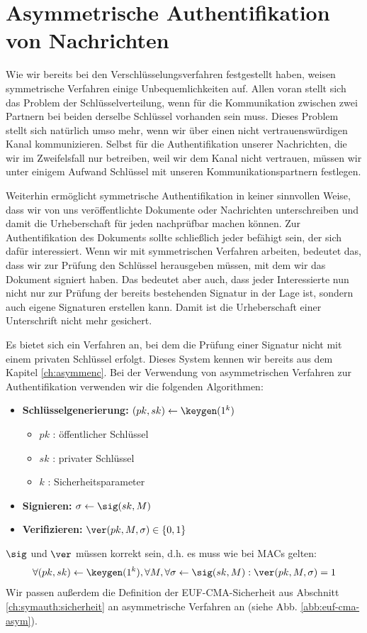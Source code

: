 \chapter{Asymmetrische Authentifikation von Nachrichten}
\label{cha:asymmauth}

Wie wir bereits bei den Verschlüsselungsverfahren festgestellt haben, weisen symmetrische Verfahren einige Unbequemlichkeiten auf. Allen voran stellt sich das Problem der Schlüsselverteilung, wenn für die Kommunikation zwischen zwei Partnern bei beiden derselbe Schlüssel vorhanden sein muss. Dieses Problem stellt sich natürlich umso mehr, wenn wir über einen nicht vertrauenswürdigen Kanal kommunizieren. Selbst für die Authentifikation unserer Nachrichten, die wir im Zweifelsfall nur betreiben, weil wir dem Kanal nicht vertrauen, müssen wir unter einigem Aufwand Schlüssel mit unseren Kommunikationspartnern festlegen.

Weiterhin ermöglicht symmetrische Authentifikation in keiner sinnvollen Weise, dass wir von uns veröffentlichte Dokumente oder Nachrichten unterschreiben und damit die Urheberschaft für jeden nachprüfbar machen können. Zur Authentifikation des Dokuments sollte schließlich jeder befähigt sein, der sich dafür interessiert. Wenn wir mit symmetrischen Verfahren arbeiten, bedeutet das, dass wir zur Prüfung den Schlüssel herausgeben müssen, mit dem wir das Dokument signiert haben. Das bedeutet aber auch, dass jeder Interessierte nun nicht nur zur Prüfung der bereits bestehenden Signatur in der Lage ist, sondern auch eigene Signaturen erstellen kann. Damit ist die Urheberschaft einer Unterschrift nicht mehr gesichert.

Es bietet sich ein Verfahren an, bei dem die Prüfung einer Signatur nicht mit einem privaten Schlüssel erfolgt. Dieses System kennen wir bereits aus dem Kapitel \ref{ch:asymmenc}. Bei der Verwendung von asymmetrischen Verfahren zur Authentifikation verwenden wir die folgenden Algorithmen:
\begin{itemize}
  \item \textbf{Schlüsselgenerierung:} $(pk, sk) \leftarrow \keygen(1^k)$
    \begin{itemize}
      \item $pk$ : öffentlicher Schlüssel
      \item $sk$ : privater Schlüssel
      \item $k$ : Sicherheitsparameter
    \end{itemize}
  \item \textbf{Signieren:} $\sigma \leftarrow \sig(sk,M)$
  \item \textbf{Verifizieren:} $\ver(pk,M,\sigma) \in \{ 0,1 \}$
\end{itemize}
$\sig$ und $\ver$ müssen korrekt sein, d.h. es muss wie bei MACs gelten:
\begin{equation*}
    \forall (pk,sk) \leftarrow \keygen(1^k), \forall M, \forall \sigma \leftarrow \sig(sk,M) : \ver(pk,M,\sigma) = 1
\end{equation*}
Wir passen außerdem die Definition der EUF-CMA-Sicherheit aus Abschnitt
\ref{ch:symauth:sicherheit} an asymmetrische Verfahren an (siehe Abb. \ref{abb:euf-cma-asym}).


